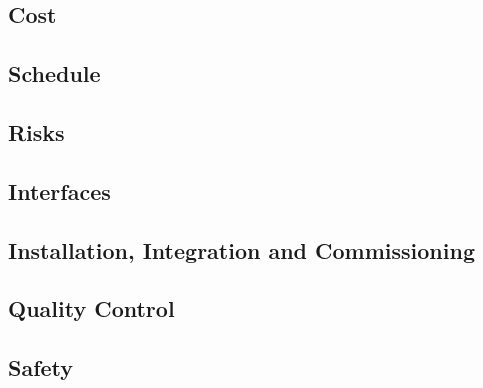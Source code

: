 \subsection{Cost}

\subsection{Schedule}

\subsection{Risks}

\subsection{Interfaces}

\subsection{Installation, Integration and Commissioning}

\subsection{Quality Control}

\subsection{Safety}


